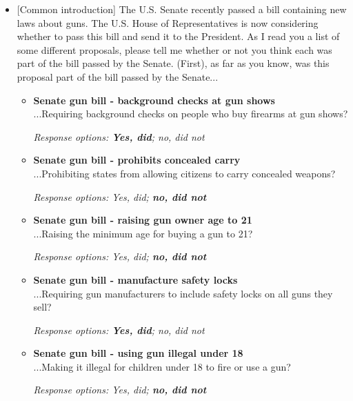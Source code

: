 \documentclass[12pt, letterpaper]{article}
\begin{document}
\begin{itemize}
\item{[Common introduction] The U.S. Senate recently passed a bill containing new laws about guns. The U.S. House of Representatives is now considering whether to pass this bill and send it to the President. As I read you a list of some different proposals, please tell me whether or not you think each was part of the bill passed by the Senate. (First), as far as you know, was this proposal part of the bill passed by the Senate...

   \begin{itemize}
\item \textbf{Senate gun bill - background checks at gun shows} \\
...Requiring background checks on people who buy firearms at gun shows?

\textit{Response options: \textbf{Yes, did}; no, did not}
\end{itemize}

   \begin{itemize}
\item \textbf{Senate gun bill - prohibits concealed carry} \\
...Prohibiting states from allowing citizens to carry concealed weapons?

\textit{Response options: Yes, did; \textbf{no, did not}}
\end{itemize}

   \begin{itemize}
\item \textbf{Senate gun bill - raising gun owner age to 21} \\
...Raising the minimum age for buying a gun to 21?

\textit{Response options: Yes, did; \textbf{no, did not}}
\end{itemize}

   \begin{itemize}
\item \textbf{Senate gun bill - manufacture safety locks} \\
...Requiring gun manufacturers to include safety locks on all guns they sell?

\textit{Response options: \textbf{Yes, did}; no, did not}
\end{itemize}

   \begin{itemize}
\item \textbf{Senate gun bill - using gun illegal under 18} \\
...Making it illegal for children under 18 to fire or use a gun?

\textit{Response options: Yes, did; \textbf{no, did not}}
\end{itemize}}
\end{itemize}
\end{document}
